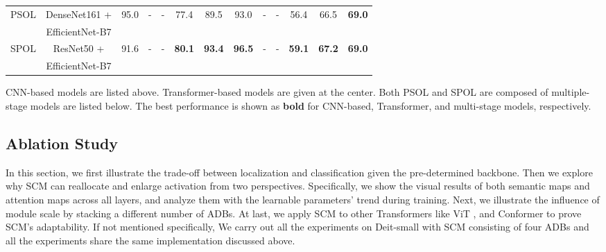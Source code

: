 \documentclass[runningheads]{llncs}
\begin{document}
\begin{table*}[t]
{\begin{threeparttable}
\begin{tabular}{c|c|c|cc|ccc|cc|ccc}
\hline
\multirow{2}{*}{PSOL\cite{DBLP:journals/corr/abs-2002-11359}} & DenseNet161 + & \multirow{2}{*}{95.0} &\multirow{2}{*}{-}  &\multirow{2}{*}{-} & \multirow{2}{*}{77.4}  &\multirow{2}{*}{89.5} &\multirow{2}{*}{93.0} & \multirow{2}{*}{-} & \multirow{2}{*}{-} & \multirow{2}{*}{56.4} & \multirow{2}{*}{66.5} & \multirow{2}{*}{\textbf{69.0}} \\
& EfficientNet-B7 & & & & & & & & & & & \\ 
\multirow{2}{*}{SPOL\cite{DBLP:journals/corr/abs-2002-11359}} & ResNet50 + & \multirow{2}{*}{91.6} &\multirow{2}{*}{-}  &\multirow{2}{*}{-} & \multirow{2}{*}{\textbf{80.1}}  &\multirow{2}{*}{\textbf{93.4}} &\multirow{2}{*}{\textbf{96.5}} & \multirow{2}{*}{-} & \multirow{2}{*}{-} & \multirow{2}{*}{\textbf{59.1}} & \multirow{2}{*}{\textbf{67.2}} & \multirow{2}{*}{\textbf{69.0}} \\
& EfficientNet-B7 & & & & & & & & & & & \\ 

\bottomrule[1.5pt]
\end{tabular}

\begin{tablenotes}
\item * CNN-based models are listed above. Transformer-based models are given at the center. Both PSOL \cite{DBLP:journals/corr/abs-2002-11359} and SPOL \cite{Wei_2021_CVPR} are composed of multiple-stage models are listed below. The best performance is shown as \textbf{bold} for CNN-based, Transformer, and multi-stage models, respectively.
\end{tablenotes}
\end{threeparttable}
}
\end{table*}








\subsection{Ablation Study}

In this section, we first illustrate the trade-off between localization and classification given the pre-determined backbone. Then we explore why SCM can reallocate and enlarge activation from two perspectives. Specifically, we show the visual results of both semantic maps  and attention maps  across all layers, and analyze them with the learnable parameters' trend during training. 
Next, we illustrate the influence of module scale by stacking a different number of ADBs. At last, we apply SCM to other Transformers like ViT \cite{DBLP:journals/corr/abs-2103-13915}, and Conformer \cite{gulati2020conformer} to prove SCM's adaptability. If not mentioned specifically, We carry out all the experiments on Deit-small with SCM consisting of four ADBs and all the experiments share the same implementation discussed above.
\end{document}

